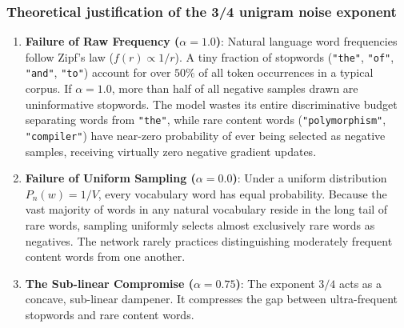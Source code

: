\documentclass[../../main.tex]{subfiles}
\begin{document}
\subsubsection{Theoretical justification of the 3/4 unigram noise exponent}
\begin{enumerate}
    \item \textbf{Failure of Raw Frequency ($\alpha = 1.0$)}: Natural language word frequencies follow Zipf's law ($f(r) \propto 1/r$). A tiny fraction of stopwords (\texttt{"the"}, \texttt{"of"}, \texttt{"and"}, \texttt{"to"}) account for over $50\%$ of all token occurrences in a typical corpus. If $\alpha = 1.0$, more than half of all negative samples drawn are uninformative stopwords. The model wastes its entire discriminative budget separating words from \texttt{"the"}, while rare content words (\texttt{"polymorphism"}, \texttt{"compiler"}) have near-zero probability of ever being selected as negative samples, receiving virtually zero negative gradient updates.
    
    \item \textbf{Failure of Uniform Sampling ($\alpha = 0.0$)}: Under a uniform distribution $P_n(w) = 1/V$, every vocabulary word has equal probability. Because the vast majority of words in any natural vocabulary reside in the long tail of rare words, sampling uniformly selects almost exclusively rare words as negatives. The network rarely practices distinguishing moderately frequent content words from one another.
    
    \item \textbf{The Sub-linear Compromise ($\alpha = 0.75$)}: The exponent $3/4$ acts as a concave, sub-linear dampener. It compresses the gap between ultra-frequent stopwords and rare content words.
\end{enumerate}
\end{document}

